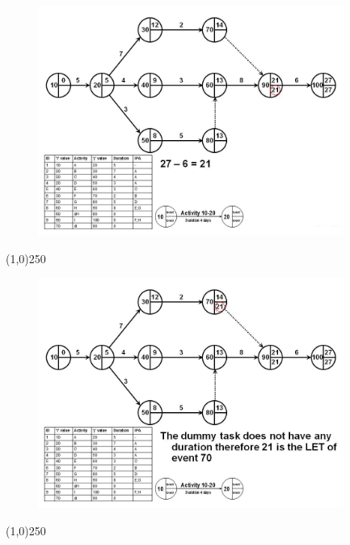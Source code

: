 \begin{frame}
\begin{figure}
	\centering
		\includegraphics[width = 10.0cm]{oldnotes/Slide112.jpg}
\end{figure}
\end{frame}
\begin{center}\line(1,0){250}\end{center}


\begin{frame}
\begin{figure}
	\centering
		\includegraphics[width = 10.0cm]{oldnotes/Slide113.jpg}
\end{figure}
\end{frame}
\begin{center}\line(1,0){250}\end{center}


